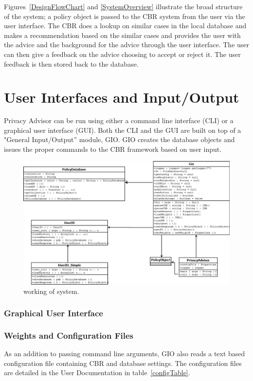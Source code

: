 Figures~\ref{DesignFlowChart} and \ref{SystemOverview} illustrate the broad structure of the system; a policy object is passed to the CBR system from the user via the user interface. The CBR does a lookup on similar cases in the local database and makes a recommendation based on the similar cases and provides the user with the advice and the background for the advice through the user interface. The user can then give a feedback on the advice choosing to accept or reject it. The user feedback is then stored back to the database.

\section{User Interfaces and Input/Output}
Privacy Advisor can be run using either a command line interface (CLI) or a graphical user interface (GUI). Both the CLI and the GUI are built on top of a "General Input/Output'' module, GIO. GIO creates the database objects and issues the proper commands to the CBR framework based on user input.

\begin{figure}[htbp]
\begin{center}
\includegraphics[width = \textwidth]{DesignReport/uml/gio.png}
\caption{working of system.}
\label{working of system}
\end{center}
\end{figure}


\subsubsection{Graphical User Interface} 

\subsubsection{Weights and Configuration Files}
As an addition to passing command line arguments, GIO also reads a text based configuration file containing CBR and database settings. The configuration files are detailed in the User Documentation in table~\ref{configTable}. 

